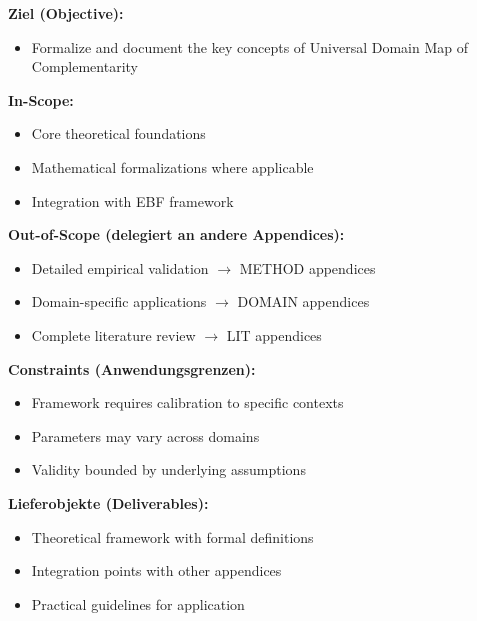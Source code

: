 
\begin{tcolorbox}[
    colback=orange!5!white,
    colframe=orange!75!black,
    title={\textbf{Appendix Scope: Ziel / In-Scope / Out-of-Scope / Constraints}},
    fonttitle=\bfseries
]

\textbf{Ziel (Objective):}
\begin{itemize}[nosep]
    \item Formalize and document the key concepts of Universal Domain Map of Complementarity
\end{itemize}

\textbf{In-Scope:}
\begin{itemize}[nosep]
    \item Core theoretical foundations
    \item Mathematical formalizations where applicable
    \item Integration with EBF framework
\end{itemize}

\textbf{Out-of-Scope (delegiert an andere Appendices):}
\begin{itemize}[nosep]
    \item Detailed empirical validation $\rightarrow$ METHOD appendices
    \item Domain-specific applications $\rightarrow$ DOMAIN appendices
    \item Complete literature review $\rightarrow$ LIT appendices
\end{itemize}

\textbf{Constraints (Anwendungsgrenzen):}
\begin{itemize}[nosep]
    \item Framework requires calibration to specific contexts
    \item Parameters may vary across domains
    \item Validity bounded by underlying assumptions
\end{itemize}

\textbf{Lieferobjekte (Deliverables):}
\begin{itemize}[nosep]
    \item Theoretical framework with formal definitions
    \item Integration points with other appendices
    \item Practical guidelines for application
\end{itemize}

\end{tcolorbox}




